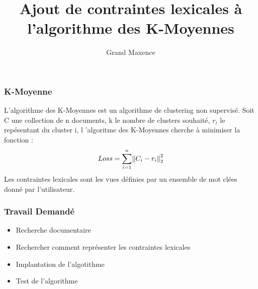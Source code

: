 \documentclass{beamer}
\begin{document}
\title{Ajout de contraintes lexicales \`a l'algorithme des  K-Moyennes}
\author{Grand Maxence}

\maketitle

\begin{frame}
  \frametitle{K-Moyenne}

  L'algorithme des K-Moyennes est un algorithme de clustering non supervis\'e.
\pause
  Soit C une collection de n documents, k le nombre de clusters souhait\'e, $r_i$
  le rep\'esentant du cluster i, l 'algoritme des  K-Moyennes cherche \`a minimiser la fonction : 
\\
\[
Loss = \sum_{i=1}^n \norm{C_i - r_i}_2^2
\]
\pause
Les contraintes lexicales sont les vues d\'efinies par un ensemble de mot cl\'ees
donn\'e par l'utilisateur.
\end{frame}

\begin{frame}
  \frametitle{Travail Demand\'e}
  \begin{itemize}
  \item Recherche documentaire
  \item Rechercher comment repr\'esenter les contraintes lexicales
  \item Implantation de l'algotithme
  \item Test de l'algorithme
  \end{itemize}
\end{frame}
\end{document}
